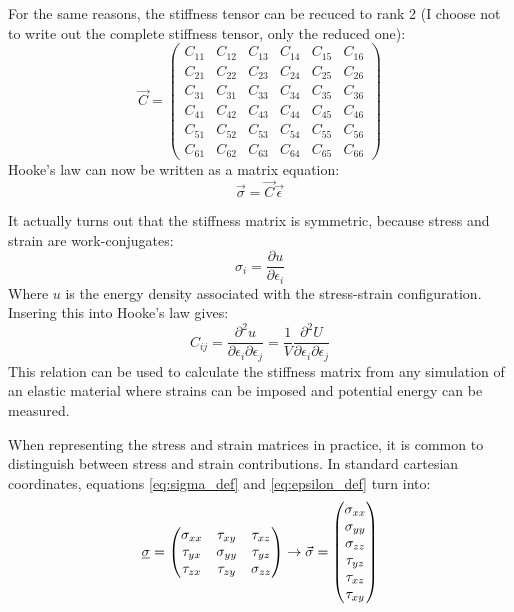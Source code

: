 For the same reasons, the stiffness tensor can be recuced to rank 2 (I choose not to write out the complete stiffness tensor, only the reduced one):
\begin{equation}
	\vec{C} =
	\begin{pmatrix}
	C_{11} & C_{12} & C_{13} & C_{14} & C_{15} & C_{16} \\
	C_{21} & C_{22} & C_{23} & C_{24} & C_{25} & C_{26} \\
	C_{31} & C_{31} & C_{33} & C_{34} & C_{35} & C_{36} \\
	C_{41} & C_{42} & C_{43} & C_{44} & C_{45} & C_{46} \\
	C_{51} & C_{52} & C_{53} & C_{54} & C_{55} & C_{56} \\
	C_{61} & C_{62} & C_{63} & C_{64} & C_{65} & C_{66}
	\end{pmatrix}
\end{equation}
Hooke's law can now be written as a matrix equation:
\begin{equation}
	\vec{\sigma} = \vec{C}\vec{\epsilon}
\end{equation}

It actually turns out that the stiffness matrix is symmetric, because stress and strain are work-conjugates:
\begin{equation}
	\sigma_i = \frac{\partial u}{\partial \epsilon_i}
\end{equation}
Where $u$ is the energy density associated with the stress-strain configuration.
Insering this into Hooke's law gives:
\begin{equation}
	C_{ij}=\frac{\partial^2 u}{\partial \epsilon_i \partial \epsilon_j} = \frac{1}{V} \frac{\partial^2 U}{\partial \epsilon_i \partial \epsilon_j} 
\end{equation}
This relation can be used to calculate the stiffness matrix from any simulation of an elastic material where strains can be imposed and potential energy can be measured.

When representing the stress and strain matrices in practice, it is common to distinguish between stress and strain contributions. In standard cartesian coordinates, equations \ref{eq:sigma_def} and \ref{eq:epsilon_def} turn into:
\begin{equation}
	\uline{\sigma} = 
	\begin{pmatrix}
	\sigma_{xx} & \tau_{xy} & \tau_{xz} \\
	\tau_{yx} & \sigma_{yy} & \tau_{yz} \\
	\tau_{zx} & \tau_{zy} & \sigma_{zz} \\ 
	\end{pmatrix}
	\to 
	\vec{\sigma} = 
	\begin{pmatrix}
	\sigma_{xx} \\ \sigma_{yy} \\ \sigma_{zz} \\ \tau_{yz} \\ \tau_{xz} \\ \tau_{xy}
	\end{pmatrix}
\end{equation}

